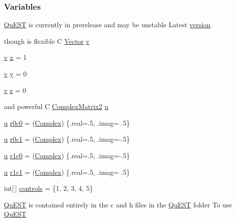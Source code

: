 \subsubsection*{Variables}
\begin{DoxyCompactItemize}
\item 
\hyperlink{README_8md_a2d0f5bba181ef1543dc90d4f1ce64c5e}{QuEST} is currently in prerelease and may be unstable Latest \hyperlink{README_8md_a94df19ae37ab2d673ea00c5d31754e61}{version}
\item 
though is flexible C \hyperlink{structVector}{Vector} \hyperlink{README_8md_a22eb3b09da74633038e36bd8dfef55c0}{v}
\item 
\hyperlink{README_8md_a22eb3b09da74633038e36bd8dfef55c0}{v} \hyperlink{README_8md_a6a52a27535805eddc782c67f42c20c69}{x} = 1
\item 
\hyperlink{README_8md_a22eb3b09da74633038e36bd8dfef55c0}{v} \hyperlink{README_8md_a003dc5701d53a819228f5417a8089139}{y} = 0
\item 
\hyperlink{README_8md_a22eb3b09da74633038e36bd8dfef55c0}{v} \hyperlink{README_8md_a0f9f545825a114923b98de8cc33a5f6a}{z} = 0
\item 
and powerful C \hyperlink{structComplexMatrix2}{ComplexMatrix2} \hyperlink{README_8md_a5d1c311241dc8d8ffa4badf059977dc5}{u}
\item 
\hyperlink{README_8md_a5d1c311241dc8d8ffa4badf059977dc5}{u} \hyperlink{README_8md_a28c529de4915322d2a51f2c1a424c672}{r0c0} = (\hyperlink{structComplex}{Complex}) \{.real=.5, .imag= .5\}
\item 
\hyperlink{README_8md_a5d1c311241dc8d8ffa4badf059977dc5}{u} \hyperlink{README_8md_a444db2ee26ed224e9370770814cb4b50}{r0c1} = (\hyperlink{structComplex}{Complex}) \{.real=.5, .imag=-\/.5\}
\item 
\hyperlink{README_8md_a5d1c311241dc8d8ffa4badf059977dc5}{u} \hyperlink{README_8md_a698aa54017453fbfbf429e0e46821ef8}{r1c0} = (\hyperlink{structComplex}{Complex}) \{.real=.5, .imag=-\/.5\}
\item 
\hyperlink{README_8md_a5d1c311241dc8d8ffa4badf059977dc5}{u} \hyperlink{README_8md_aae8b0c0e5cc303f7560cb29107cd0787}{r1c1} = (\hyperlink{structComplex}{Complex}) \{.real=.5, .imag= .5\}
\item 
int\mbox{[}$\,$\mbox{]} \hyperlink{README_8md_a636f16bb55903420974dfd184205e591}{controls} = \{1, 2, 3, 4, 5\}
\item 
\hyperlink{README_8md_a2d0f5bba181ef1543dc90d4f1ce64c5e}{QuEST} is contained entirely in the c and h files in the \hyperlink{README_8md_a2d0f5bba181ef1543dc90d4f1ce64c5e}{QuEST} folder To use \hyperlink{README_8md_a2d0f5bba181ef1543dc90d4f1ce64c5e}{QuEST}
\end{DoxyCompactItemize}


